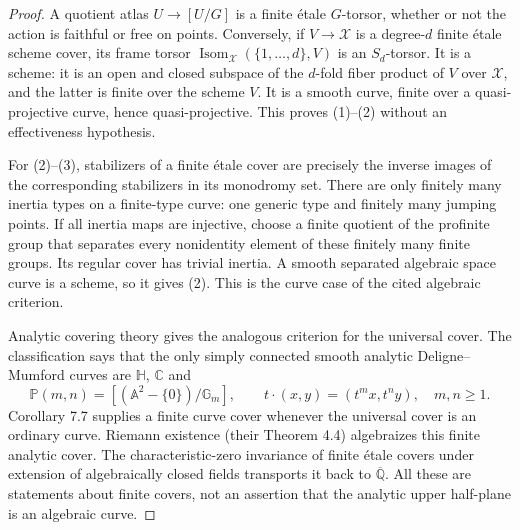 \begin{proof}
A quotient atlas $U\to[U/G]$ is a finite \'etale $G$-torsor, whether
or not the action is faithful or free on points. Conversely, if
$V\to\mathcal X$ is a degree-$d$ finite \'etale scheme cover, its
frame torsor
$\operatorname{Isom}_{\mathcal X}(\{1,\ldots,d\},V)$ is an
$S_d$-torsor. It is a scheme: it is an open and closed subspace of
the $d$-fold fiber product of $V$ over $\mathcal X$, and the latter
is finite over the scheme $V$. It is a smooth curve, finite over a
quasi-projective curve, hence quasi-projective. This proves (1)--(2)
without an effectiveness hypothesis.

For (2)--(3), stabilizers of a finite \'etale cover are precisely the
inverse images of the corresponding stabilizers in its monodromy set.
There are only finitely many inertia types on a finite-type curve:
one generic type and finitely many jumping points. If all inertia
maps are injective, choose a finite quotient of the profinite group
that separates every nonidentity element of these finitely many
finite groups. Its regular cover has trivial inertia. A smooth
separated algebraic space curve is a scheme, so it gives (2).
This is the curve case of the cited algebraic criterion.

Analytic covering theory gives the analogous criterion for the
universal cover. The classification says that the only simply
connected smooth analytic Deligne--Mumford curves are $\mathbb H$,
$\mathbb C$ and
\[
 \mathbb P(m,n)=[(\mathbb A^2-\{0\})/\mathbb G_m],
 \qquad t\cdot(x,y)=(t^m x,t^n y),\quad m,n\geq1.
\]
Corollary 7.7 supplies a finite curve cover whenever the universal
cover is an ordinary curve. Riemann existence (their Theorem 4.4)
algebraizes this finite analytic cover. The characteristic-zero
invariance of finite \'etale covers under extension of algebraically
closed fields transports it back to $\overline{\mathbb Q}$.
All these are statements about finite covers, not an assertion that
the analytic upper half-plane is an algebraic curve.
\end{proof}

